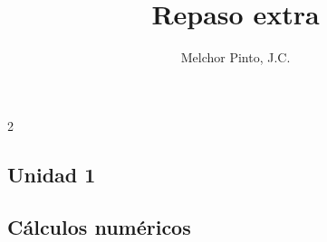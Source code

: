 \documentclass[12pt,addpoints,answers]{repaso2}
\title{Repaso extra}
\author{Melchor Pinto, J.C.}
\begin{document}
\INFO
\newpage
\begin{multicols}{2}
	\tableofcontents
\end{multicols}
\newpage
\begin{questions}
		\section{Unidad 1}
	\subsection{Cálculos numéricos}
	 \questionboxed[1]{}


\end{questions}
\end{document}
